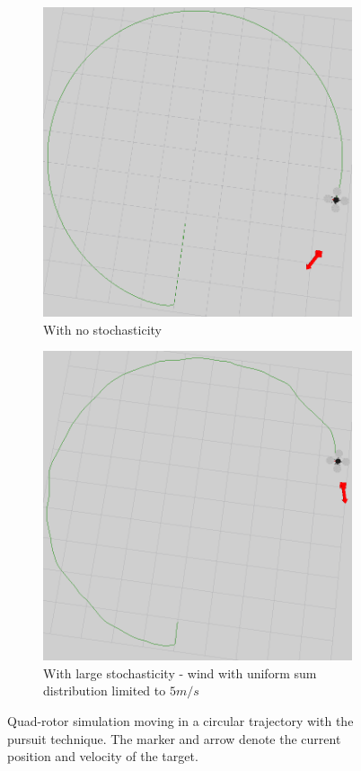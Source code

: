 \documentclass[hidelinks,BTech]{iitmdiss}
\begin{document}
\begin{figure}[H]
  \centering
  \begin{subfigure}[t]{0.45\textwidth}
    \centering
      \includegraphics[width=\textwidth]{pursuit_circle.png}
      \caption{With no stochasticity}
  \end{subfigure}
  \begin{subfigure}[t]{0.45\textwidth}
    \centering
      \includegraphics[width=\textwidth]{pursuit_circle_wind.png}
      \caption{With large stochasticity - wind with uniform sum distribution limited to $5 m/s$}
  \end{subfigure}
  \caption{Quad-rotor simulation moving in a circular trajectory with the pursuit technique. The marker and arrow denote the current position and velocity of the target.}
\end{figure}
\end{document}
